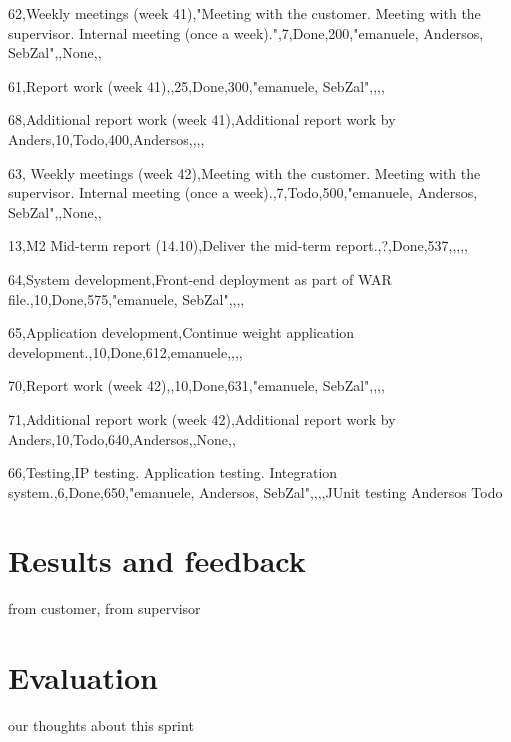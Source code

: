 62,Weekly meetings (week 41),"Meeting with the customer.
Meeting with the supervisor.
Internal meeting (once a week).",7,Done,200,"emanuele, Andersos, SebZal",,None,,

61,Report work (week 41),,25,Done,300,"emanuele, SebZal",,,,

68,Additional report work (week 41),Additional report work by Anders,10,Todo,400,Andersos,,,,

63, Weekly meetings (week 42),Meeting with the customer. Meeting with the supervisor. Internal meeting (once a week).,7,Todo,500,"emanuele, Andersos, SebZal",,None,,

13,M2 Mid-term report (14.10),Deliver the mid-term report.,?,Done,537,,,,,

64,System development,Front-end deployment as part of WAR file.,10,Done,575,"emanuele, SebZal",,,,

65,Application development,Continue weight application development.,10,Done,612,emanuele,,,,

70,Report work (week 42),,10,Done,631,"emanuele, SebZal",,,,

71,Additional report work (week 42),Additional report work by Anders,10,Todo,640,Andersos,,None,,

66,Testing,IP testing. Application testing. Integration system.,6,Done,650,"emanuele, Andersos, SebZal",,,,JUnit testing	Andersos	Todo



\section{Results and feedback}
from customer, from supervisor
\section{Evaluation}
our thoughts about this sprint

